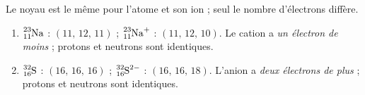 \documentclass[11pt,a4paper]{article}
\begin{document}
\begin{corrige}
Le noyau est le même pour l'atome et son ion ; seul le nombre d'électrons diffère.
\begin{enumerate}[label=\alph*)]
  \item $\ce{^{23}_{11}Na}$ : $(11,\,12,\,11)$ ; \quad $\ce{^{23}_{11}Na^{+}}$ : $(11,\,12,\,10)$.
        Le cation a \emph{un électron de moins} ; protons et neutrons sont identiques.
  \item $\ce{^{32}_{16}S}$ : $(16,\,16,\,16)$ ; \quad $\ce{^{32}_{16}S^{2-}}$ : $(16,\,16,\,18)$.
        L'anion a \emph{deux électrons de plus} ; protons et neutrons sont identiques.
\end{enumerate}
\end{corrige}
\end{document}
